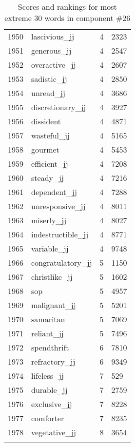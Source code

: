 \begin{longtable}[!htbp]{| rlr@{.}l |}
    1950 & lascivious\_jj & 4 & 2323 \\
    1951 & generous\_jj & 4 & 2547 \\
    1952 & overactive\_jj & 4 & 2607 \\
    1953 & sadistic\_jj & 4 & 2850 \\
    1954 & unread\_jj & 4 & 3686 \\
    1955 & discretionary\_jj & 4 & 3927 \\
    1956 & dissident & 4 & 4871 \\
    1957 & wasteful\_jj & 4 & 5165 \\
    1958 & gourmet & 4 & 5453 \\
    1959 & efficient\_jj & 4 & 7208 \\
    1960 & steady\_jj & 4 & 7216 \\
    1961 & dependent\_jj & 4 & 7288 \\
    1962 & unresponsive\_jj & 4 & 8011 \\
    1963 & miserly\_jj & 4 & 8027 \\
    1964 & indestructible\_jj & 4 & 8771 \\
    1965 & variable\_jj & 4 & 9748 \\
    1966 & congratulatory\_jj & 5 & 1150 \\
    1967 & christlike\_jj & 5 & 1602 \\
    1968 & sop & 5 & 4957 \\
    1969 & malignant\_jj & 5 & 5201 \\
    1970 & samaritan & 5 & 7069 \\
    1971 & reliant\_jj & 5 & 7496 \\
    1972 & spendthrift & 6 & 7810 \\
    1973 & refractory\_jj & 6 & 9349 \\
    1974 & lifeless\_jj & 7 & 529 \\
    1975 & durable\_jj & 7 & 2759 \\
    1976 & exclusive\_jj & 7 & 8228 \\
    1977 & comforter & 7 & 8235 \\
    1978 & vegetative\_jj & 8 & 3654 \\
    \hline
    \caption{Scores and rankings for most extreme 30 words in component \#26} \\
\end{longtable}

